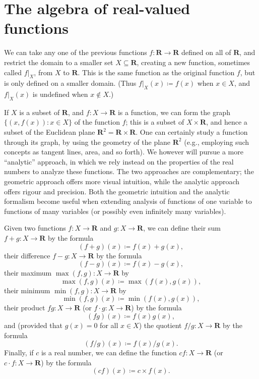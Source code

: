 \section{The algebra of real-valued functions}\label{sec 9.2}

\begin{note}
    We can take any one of the previous functions \(f : \mathbf{R} \to \mathbf{R}\) defined on all of \(\mathbf{R}\), and restrict the domain to a smaller set \(X \subseteq \mathbf{R}\), creating a new function, sometimes called \(f|_X\), from \(X\) to \(\mathbf{R}\).
    This is the same function as the original function \(f\), but is only defined on a smaller domain.
    (Thus \(f|_X(x) \coloneqq f(x)\) when \(x \in X\), and \(f|_X(x)\) is undefined when \(x \notin X\).)
\end{note}

\begin{note}
    If \(X\) is a subset of \(\mathbf{R}\), and \(f : X \to \mathbf{R}\) is a function, we can form the graph \(\{(x, f(x)) : x \in X\}\) of the function \(f\);
    this is a subset of \(X \times \mathbf{R}\), and hence a subset of the Euclidean plane \(\mathbf{R}^2 = \mathbf{R} \times \mathbf{R}\).
    One can certainly study a function through its graph, by using the geometry of the plane \(\mathbf{R}^2\)
    (e.g., employing such concepts as tangent lines, area, and so forth).
    We however will pursue a more ``analytic'' approach, in which we rely instead on the properties of the real numbers to analyze these functions.
    The two approaches are complementary;
    the geometric approach offers more visual intuition, while the analytic approach offers rigour and precision.
    Both the geometric intuition and the analytic formalism become useful when extending analysis of functions of one variable to functions of many variables
    (or possibly even infinitely many variables).
\end{note}

\begin{definition}\label{9.2.1}
    Given two functions \(f : X \to \mathbf{R}\) and \(g : X \to \mathbf{R}\), we can define their sum \(f + g : X \to \mathbf{R}\) by the formula
    \[
        (f + g)(x) \coloneqq f(x) + g(x),
    \]
    their difference \(f - g : X \to \mathbf{R}\) by the formula
    \[
        (f - g)(x) \coloneqq f(x) - g(x),
    \]
    their maximum \(\max(f, g) : X \to \mathbf{R}\) by
    \[
        \max(f, g)(x) \coloneqq \max(f(x), g(x)),
    \]
    their minimum \(\min(f, g) : X \to \mathbf{R}\) by
    \[
        \min(f, g)(x) \coloneqq \min(f(x), g(x)),
    \]
    their product \(fg : X \to \mathbf{R}\) (or \(f \cdot g : X \to \mathbf{R}\)) by the formula
    \[
        (fg)(x) \coloneqq f(x)g(x),
    \]
    and (provided that \(g(x) = 0\) for all \(x \in X\)) the quotient \(f / g : X \to \mathbf{R}\) by the formula
    \[
        (f / g)(x) \coloneqq f(x) / g(x).
    \]
    Finally, if \(c\) is a real number, we can define the function \(cf : X \to \mathbf{R}\) (or \(c \cdot f : X \to \mathbf{R}\)) by the formula
    \[
        (cf)(x) \coloneqq c \times f(x).
    \]
\end{definition}

